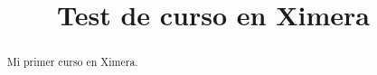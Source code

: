 \documentclass{xourse}
\title{Test de curso en Ximera}
\begin{document}
  
\begin{abstract} %
Mi primer curso en Ximera.  
\end{abstract}  
\maketitle  
 
 
\end{document}
